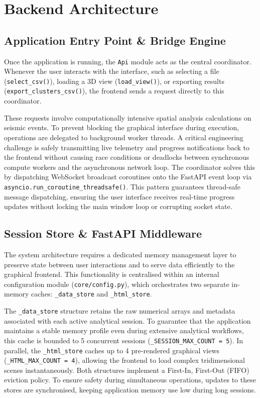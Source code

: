 \section{Backend Architecture}
\label{sec:backend}

\subsection{Application Entry Point \& Bridge Engine}
\label{sec:bridge}

Once the application is running, the \texttt{Api} module acts as the central coordinator. Whenever the user interacts with the interface, such as selecting a file (\texttt{select\allowbreak\_csv()}), loading a 3D view (\texttt{load\allowbreak\_view()}), or exporting results (\texttt{export\allowbreak\_clusters\allowbreak\_csv()}), the frontend sends a request directly to this coordinator.

These requests involve computationally intensive spatial analysis calculations on seismic events. To prevent blocking the graphical interface during execution, operations are delegated to background worker threads. A critical engineering challenge is safely transmitting live telemetry and progress notifications back to the frontend without causing race conditions or deadlocks between synchronous compute workers and the asynchronous network loop. The coordinator solves this by dispatching WebSocket broadcast coroutines onto the FastAPI event loop via \texttt{asyncio.run\_coroutine\_threadsafe()}. This pattern guarantees thread-safe message dispatching, ensuring the user interface receives real-time progress updates without locking the main window loop or corrupting socket state.

\subsection{Session Store \& FastAPI Middleware}
\label{sec:session-store}

The system architecture requires a dedicated memory management layer to preserve state between user interactions and to serve data efficiently to the graphical frontend. This functionality is centralised within an internal configuration module (\texttt{core/config.py}), which orchestrates two separate in-memory caches: \texttt{\_data\_store} and \texttt{\_html\_store}.

The \texttt{\_data\_store} structure retains the raw numerical arrays and metadata associated with each active analytical session. To guarantee that the application maintains a stable memory profile even during extensive analytical workflows, this cache is bounded to 5 concurrent sessions (\texttt{\_SESSION\_MAX\_COUNT = 5}). In parallel, the \texttt{\_html\_store} caches up to 4 pre-rendered graphical views (\texttt{\_HTML\_MAX\_COUNT = 4}), allowing the frontend to load complex tridimensional scenes instantaneously. Both structures implement a First-In, First-Out (FIFO) eviction policy. To ensure safety during simultaneous operations, updates to these stores are synchronised, keeping application memory use low during long sessions.

